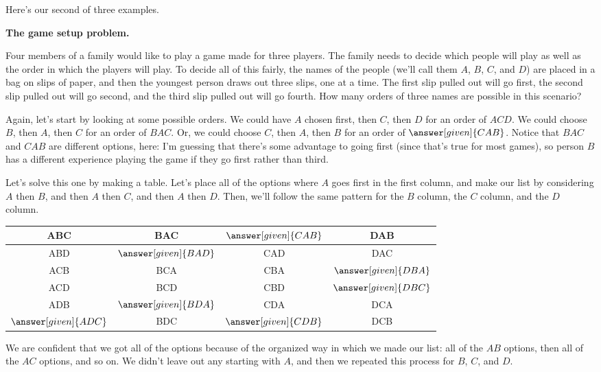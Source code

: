 \documentclass{ximera}
\begin{document}
Here's our second of three examples.
\begin{question}{\bf The game setup problem.}

Four members of a family would like to play a game made for three players. The family needs to decide which people will play as well as the order in which the players will play. To decide all of this fairly, the names of the people (we'll call them $A$, $B$, $C$, and $D$) are placed in a bag on slips of paper, and then the youngest person draws out three slips, one at a time. The first slip pulled out will go first, the second slip pulled out will go second, and the third slip pulled out will go fourth. How many orders of three names are possible in this scenario?

\begin{explanation}
Again, let's start by looking at some possible orders. We could have $A$ chosen first, then $C$, then $D$ for an order of $ACD$. We could choose $B$, then $A$, then $C$ for an order of $BAC$. Or, we could choose $C$, then $A$, then $B$ for an order of $\answer[given]{CAB}$. Notice that $BAC$ and $CAB$ are different options, here: I'm guessing that there's some advantage to going first (since that's true for most games), so person $B$ has a different experience playing the game if they go first rather than third.

Let's solve this one by making a table. Let's place all of the options where $A$ goes first in the first column, and make our list by considering $A$ then $B$, and then $A$ then $C$, and then $A$ then $D$. Then, we'll follow the same pattern for the $B$ column, the $C$ column, and the $D$ column.
\begin{image}
\begin{tabular}{|c|c|c|c|} \hline
ABC & BAC & $\answer[given]{CAB}$ & DAB \\ \hline
ABD & $\answer[given]{BAD}$ & CAD & DAC \\ \hline
ACB & BCA & CBA & $\answer[given]{DBA}$ \\ \hline
ACD & BCD & CBD & $\answer[given]{DBC}$ \\ \hline
ADB & $\answer[given]{BDA}$ & CDA & DCA \\ \hline
$\answer[given]{ADC}$ & BDC & $\answer[given]{CDB}$ & DCB \\ \hline
\end{tabular}
\end{image}

We are confident that we got all of the options because of the organized way in which we made our list: all of the $AB$ options, then all of the $AC$ options, and so on. We didn't leave out any starting with $A$, and then we repeated this process for $B$, $C$, and $D$.



\end{explanation}
\end{question}
\end{document}
